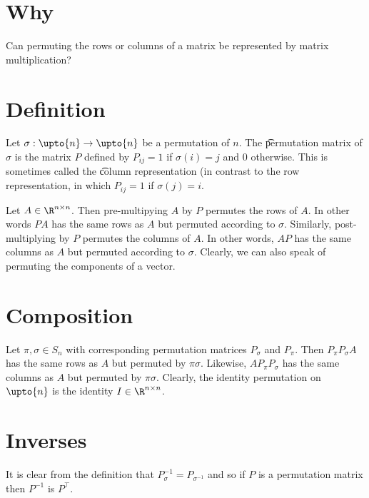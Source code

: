 
\section*{Why}

Can permuting the rows or columns of a matrix be represented by matrix multiplication?

\section*{Definition}

Let $\sigma  : \upto{n} \to \upto{n}$ be a permutation of $n$.
The \t{permutation matrix} of $\sigma  $ is the matrix $P$ defined by $P_{ij} = 1$ if $\sigma  (i) = j$ and 0 otherwise.
This is sometimes called the \t{column representation} (in contrast to the row representation, in which $P_{ij} = 1$ if $\sigma  (j) = i$.

Let $A \in \R  ^{n \times  n}$.
Then pre-multipying $A$ by $P$ permutes the rows of $A$.
In other words $PA$ has the same rows as $A$ but permuted according to $\sigma  $.
Similarly, post-multiplying by $P$ permutes the columns of $A$.
In other words, $AP$ has the same columns as $A$ but permuted according to $\sigma  $.
Clearly, we can also speak of permuting the components of a vector.

\section*{Composition}

Let $\pi  , \sigma  \in S_n$ with corresponding permutation matrices $P_\sigma  $ and $P_\pi  $.
Then $P_{\pi  }P_{\sigma  }A$ has the same rows as $A$ but permuted by $\pi  \sigma  $.
Likewise, $AP_{\pi  }P_{\sigma  }$ has the same columns as $A$ but permuted by $\pi  \sigma  $.
Clearly, the identity permutation on $\upto{n}$ is the identity $I \in \R  ^{n \times  n}$.

\section*{Inverses}

It is clear from the definition that $P_{\sigma  }^{-1} = P_{\sigma  ^{-1}}$ and so if $P$ is a permutation matrix then $P^{-1}$ is $P^\top $.

\blankpage
